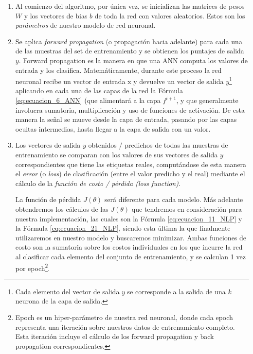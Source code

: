 \documentclass[12pt,a4paper]{article}
\begin{document}
\begin{sloppypar}
\begin{enumerate}
\item Al comienzo del algoritmo, por única vez, se inicializan las matrices de pesos $W$ y los vectores de bias $b$ de toda la red con valores aleatorios. Estos son los \textit{parámetros} de nuestro modelo de red neuronal.
  
\item Se aplica \textit{forward propagation} (o propagación hacia adelante) para cada una de las muestras del set de entrenamiento y se obtienen los puntajes de salida $y$. Forward propagation es la manera en que una ANN computa los valores de entrada y los clasifica. Matemáticamente, durante este proceso la red neuronal recibe un vector de entrada x y devuelve un vector de salida $y$\footnote{Cada elemento del vector de salida $y$ se corresponde a la salida de una $k$ neurona de la capa de salida.} aplicando en cada una de las capas de la red la Fórmula \ref{eq:ecuacion_6_ANN} (que alimentará a la capa $f^{i+1}$, y que generalmente involucra sumatoria, multiplicación y uso de funciones de activación. De esta manera la señal se mueve desde la capa de entrada, pasando por las capas ocultas intermedias, hasta llegar a la capa de salida con un valor.

\item Los vectores de salida $y$ obtenidos / predichos de todas las muestras de entrenamiento se comparan con los valores de sus vectores de salida $y$ correspondientes que tiene las etiquetas reales, computándose de esta manera el \textit{error} (o \textit{loss}) de clasificación (entre el valor predicho y el real) mediante el cálculo de la \textit{función de costo / pérdida (loss function)}.

La función de pérdida  $J(\theta)$ será diferente para cada modelo. Más adelante obtendremos los cálculos de las $J(\theta)$ que tendremos en consideración para nuestra implementación, las cuales son la Fórmula \ref{eq:ecuacion_11_NLP} y la Fórmula \ref{eq:ecuacion_21_NLP}, siendo esta última la que finalmente utilizaremos en nuestro modelo y buscaremos minimizar. Ambas funciones de costo son la sumatoria sobre los costos individuales en los que incurre la red al clasificar cada elemento del conjunto de entrenamiento, y se calculan 1 vez por epoch\footnote{Epoch es un hiper-parámetro de nuestra red neuronal, donde cada epoch representa una iteración sobre nuestros datos de entrenamiento completo. Esta iteración incluye el cálculo de los forward propagation y back propagation correspondientes.}.


\end{enumerate}
\end{sloppypar}
\end{document}
